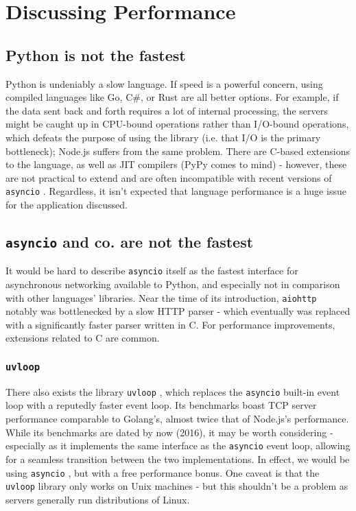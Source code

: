 \documentclass[letterpaper,twocolumn,10pt]{article}
\newcommand{\code}[1]{
    \texttt{#1}
}
\begin{document}
\section{Discussing Performance}

\subsection{Python is not the fastest}

Python is undeniably a slow language.  If speed is a powerful concern, using compiled languages like
Go, C\#, or Rust are all better options.  For example, if the data sent back and forth 
requires a lot of internal processing, the servers might be caught up in CPU-bound operations 
rather than I/O-bound operations, which defeats the purpose of using the library 
(i.e. that I/O is the primary bottleneck); Node.js suffers from the same problem.  
There are C-based extensions to the language, as well
as JIT compilers (PyPy comes to mind) - however, these are not practical to extend and are often
incompatible with recent versions of \code{asyncio}.  Regardless, it isn't expected that language 
performance is a huge issue for the application discussed.


\subsection{\code{asyncio} and co. are not the fastest}

It would be hard to describe \code{asyncio} itself as the fastest interface for asynchronous networking
available to Python, and especially not in comparison with other languages' libraries.  Near the time
of its introduction, \code{aiohttp} notably was bottlenecked by a slow HTTP parser - which
eventually was replaced with a significantly faster parser written in C.  For performance improvements,
extensions related to C are common.


\subsubsection*{\code{uvloop}}

There also exists the library \code{uvloop}, which replaces the \code{asyncio} built-in event loop with
a reputedly faster event loop.  Its benchmarks boast TCP server performance comparable to Golang's,
almost twice that of Node.js's performance. While its benchmarks are dated by now (2016), it may be worth
considering - especially as it implements the same interface as the \code{asyncio} event loop, allowing
for a seamless transition between the two implementations.  In effect, we would be using \code{asyncio},
but with a free performance bonus.  One caveat is that the \code{uvloop} library only works on Unix
machines - but this shouldn't be a problem as servers generally run distributions of Linux.
\end{document}

